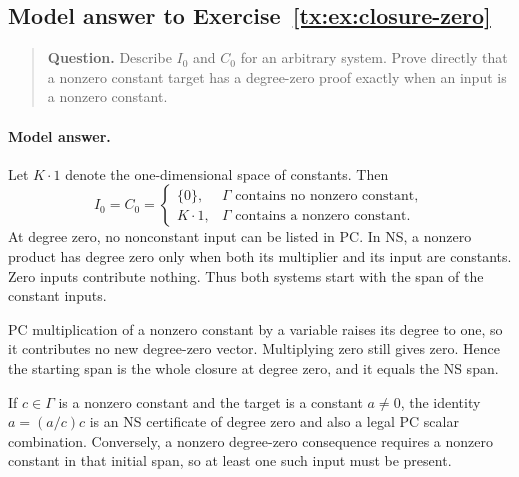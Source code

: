 \begin{samepage}

\subsection*{Model answer to Exercise~\ref{tx:ex:closure-zero}}\label{tx:ans:closure-zero}

\begin{quote}\small\textbf{Question.} Describe $I_0$ and $C_0$ for an arbitrary system. Prove directly that a
nonzero constant target has a degree-zero proof exactly when an input
is a nonzero constant.
\end{quote}

\paragraph{Model answer.}
Let \(K\cdot1\) denote the one-dimensional space of constants.
Then
\[
 I_0=C_0=
 \begin{cases}
   \{0\},&\Gamma\text{ contains no nonzero constant},\\
   K\cdot1,&\Gamma\text{ contains a nonzero constant}.
 \end{cases}
\]
At degree zero, no nonconstant input can be listed in PC. In NS,
a nonzero product has degree zero only when both its multiplier
and its input are constants. Zero inputs contribute nothing.
Thus both systems start with the span of the constant inputs.
\end{samepage}

PC multiplication of a nonzero constant by a variable raises its
degree to one, so it contributes no new degree-zero vector. Multiplying
zero still gives zero. Hence the starting span is the whole closure
at degree zero, and it equals the NS span.

If \(c\in\Gamma\) is a nonzero constant and the target is a constant
\(a\ne0\), the identity \(a=(a/c)c\) is an NS certificate of degree
zero and also a legal PC scalar combination. Conversely, a nonzero
degree-zero consequence requires a nonzero constant in that initial
span, so at least one such input must be present.


\par


